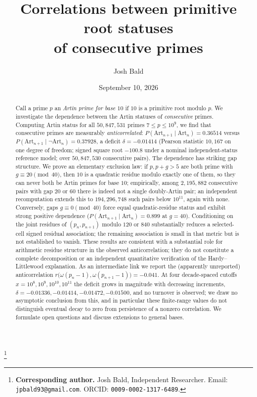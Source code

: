 \documentclass[11pt]{amsart}
\theoremstyle{definition}
\newcommand{\Art}{\mathrm{Art}}
\begin{document}
\title[Correlations between primitive root statuses of consecutive primes]{Correlations between primitive root statuses\\ of consecutive primes}

\author{Josh Bald}
\thanks{\textbf{Corresponding author.} Josh Bald, Independent Researcher.
	Email: \texttt{jpbald93@gmail.com}. ORCID: \texttt{0009-0002-1317-6489}.}

\date{September 10, 2026}


\begin{abstract}
	Call a prime $p$ an \emph{Artin prime for base $10$} if $10$ is a primitive root
	modulo $p$. We investigate the dependence between the Artin
	statuses of \emph{consecutive} primes. Computing Artin status for all
	$50{,}847{,}531$ primes $7 \le p \le 10^9$, we find that consecutive primes are
	measurably \emph{anticorrelated}: $P(\Art_{n+1} \mid \Art_n) = 0.36514$
	versus $P(\Art_{n+1} \mid \lnot\Art_n) = 0.37928$, a deficit
	$\delta = -0.01414$ (Pearson statistic $10{,}167$ on one degree of freedom;
	signed square root $-100.8$ under a nominal independent-status reference model;
	over $50{,}847{,}530$ consecutive pairs).
	The dependence has striking gap structure. We prove an elementary exclusion law:
	if $p, p + g > 5$ are both prime with
	$g \equiv 20 \pmod{40}$, then $10$ is a quadratic residue modulo exactly one of
	them, so they can never both be Artin primes for base $10$; empirically, among
	$2{,}195{,}882$ consecutive pairs with gap $20$ or $60$ there is indeed not a
	single doubly-Artin pair; an independent recomputation extends this to
	$194{,}296{,}748$ such pairs below $10^{11}$, again with none.
	Conversely, gaps $g \equiv 0 \pmod{40}$ force equal
	quadratic-residue status and exhibit strong positive dependence
	($P(\Art_{n+1} \mid \Art_n) = 0.899$ at $g = 40$). Conditioning on the joint
	residues of $(p_n, p_{n+1})$ modulo $120$ or $840$ substantially reduces a
	selected-cell signed residual association; the remaining association is small in
	that metric but is not established to vanish. These results are consistent with
	a substantial role for arithmetic residue structure in the observed
	anticorrelation; they do not constitute a complete decomposition or an
	independent quantitative verification of the Hardy--Littlewood explanation.
	As an intermediate link we report the (apparently unreported) anticorrelation
	$r\bigl(\omega(p_n - 1), \omega(p_{n+1} - 1)\bigr) = -0.041$.
	At four decade-spaced cutoffs $x = 10^8, 10^9, 10^{10}, 10^{11}$ the deficit
	grows in magnitude with decreasing increments,
	$\delta = -0.01336, -0.01414, -0.01472, -0.01500$, and no turnover is
	observed; we draw no asymptotic conclusion from this, and in particular these
	finite-range values do not distinguish eventual decay to zero from
	persistence of a nonzero correlation.
	We formulate open questions and discuss extensions to general bases.
\end{abstract}
\end{document}
